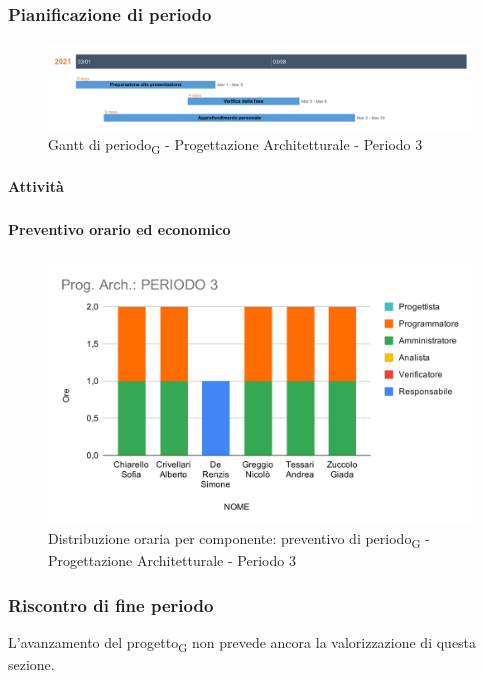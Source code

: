 \subsubsection{Pianificazione di periodo}


\begin{figure}[H]
	\centering
	\includegraphics[scale=0.30]{res/images/gantt_periodo/progarch_3_gantt.png}
	\caption{Gantt di periodo\textsubscript{G} - Progettazione Architetturale - Periodo 3}
\end{figure}

\paragraph{Attività}
\subparagraph*{}

\planningTable{
	
}



\paragraph{Preventivo orario ed economico}
\subparagraph*{}

\contabilitaTable{
	
}

\begin{figure}[H]
	\centering
	\includegraphics[scale=2]{res/images/charts/preventivo/prog_arch_3.png}
	\caption{Distribuzione oraria per componente: preventivo di periodo\textsubscript{G} - Progettazione Architetturale - Periodo 3}
\end{figure}

\subsubsection{Riscontro di fine periodo}


L'avanzamento del progetto\textsubscript{G} non prevede ancora la valorizzazione di questa sezione.